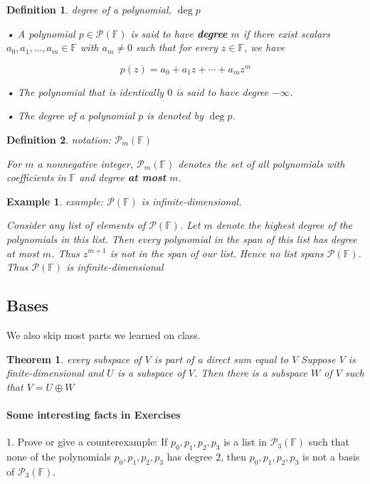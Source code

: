 \documentclass{article}
\newtheorem{theorem}{Theorem}[subsection]
\newtheorem{example}{Example}[subsection]
\newtheorem{definition}{Definition}[subsection]
\newcommand{\FF}{\mathbb{F}}
\begin{document}
\begin{CJK}{UTF8}{gkai}
\begin{definition}
    degree of a polynomial, $\deg p$

 • A polynomial $p \in \mathcal{P}(\FF)$ is said to have \textbf{degree} $m$ if there exist scalars $a_0, a_1, \ldots,a_m \in \FF$ with $a_m \neq 0$ such that for every $z \in \FF$, we have

 \[p(z) = a_0 +a_1 z+ \cdots + a_m z^m\]

 • The polynomial that is identically $0$ is said to have degree $-\infty$.

 • The degree of a polynomial $p$ is denoted by $\deg p$.
\end{definition}

\begin{definition}
    notation: $\mathcal{P}_m(\FF)$

 For $m$ a nonnegative integer, $\mathcal{P}_m(\FF)$ denotes the set of all polynomials with
 coefficients in $\FF$ and degree \textbf{at most} $m$.
\end{definition}

\begin{example}
    example: $\mathcal{P}(\FF)$ is infinite-dimensional.

 Consider any list of elements of $\mathcal{P}(\FF)$. Let $m$ denote the highest degree of the
 polynomials in this list. Then every polynomial in the span of this list has degree
 at most $m$. Thus $z^{m+1}$ is not in the span of our list. Hence no list spans $\mathcal{P}(\FF)$.
 Thus $\mathcal{P}(\FF)$ is infinite-dimensional
\end{example}

\subsection{Bases}
We also skip most parts we learned on class.

\begin{theorem}
    every subspace of $V$ is part of a direct sum equal to $V$
    Suppose $V$ is finite-dimensional and $U$ is a subspace of $V$. Then there is a
    subspace $W$ of $V$ such that $V = U\oplus W$
\end{theorem}

\paragraph{Some interesting facts in Exercises\\}

1. Prove or give a counterexample: If $p_0,p_1,p_2,p_3$ is a list in $\mathcal{P}_3(\FF)$ such that none of the polynomials $p_0,p_1,p_2,p_3$ has degree $2$, then $p_0,p_1,p_2,p_3$ is not a basis of $\mathcal{P}_3(\FF)$.\\


\end{CJK}
\end{document}
